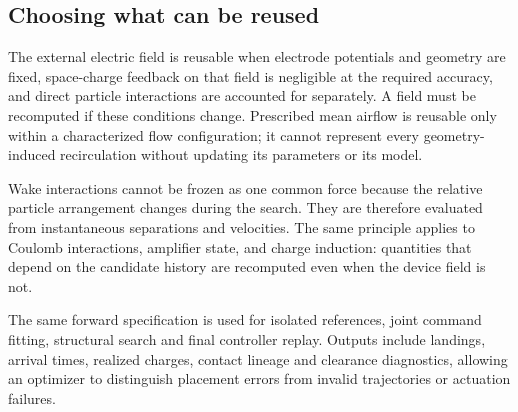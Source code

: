 \subsection{Choosing what can be reused}
The external electric field is reusable when electrode potentials and geometry are fixed, space-charge feedback on that field is negligible at the required accuracy, and direct particle interactions are accounted for separately. A field must be recomputed if these conditions change. Prescribed mean airflow is reusable only within a characterized flow configuration; it cannot represent every geometry-induced recirculation without updating its parameters or its model.

Wake interactions cannot be frozen as one common force because the relative particle arrangement changes during the search. They are therefore evaluated from instantaneous separations and velocities. The same principle applies to Coulomb interactions, amplifier state, and charge induction: quantities that depend on the candidate history are recomputed even when the device field is not.

The same forward specification is used for isolated references, joint command fitting, structural search and final controller replay. Outputs include landings, arrival times, realized charges, contact lineage and clearance diagnostics, allowing an optimizer to distinguish placement errors from invalid trajectories or actuation failures.
